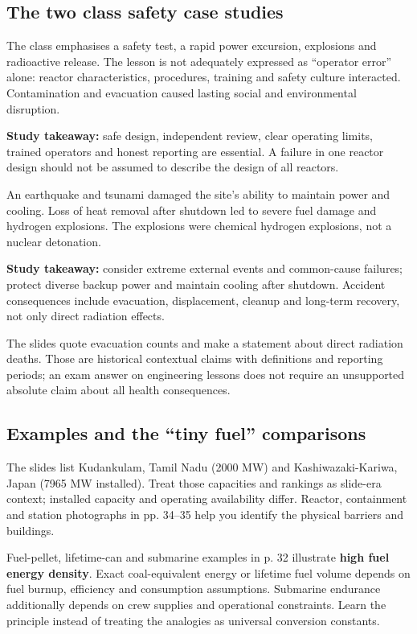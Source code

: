 \documentclass[11pt,a4paper]{article}
\newenvironment{Worked}[1]{\begin{tcolorbox}[breakable=false,colback=white,colframe=teal,colbacktitle=pale,coltitle=ink,title={#1}]}{\end{tcolorbox}}
\begin{document}
\subsection{The two class safety case studies}
\begin{Worked}{Chernobyl, Ukraine / then USSR - 26 April 1986}
The class emphasises a safety test, a rapid power excursion, explosions and radioactive release. The lesson is not adequately expressed as ``operator error'' alone: reactor characteristics, procedures, training and safety culture interacted. Contamination and evacuation caused lasting social and environmental disruption.\par
\textbf{Study takeaway:} safe design, independent review, clear operating limits, trained operators and honest reporting are essential. A failure in one reactor design should not be assumed to describe the design of all reactors.
\end{Worked}
\begin{Worked}{Fukushima Daiichi, Japan - 11 March 2011}
An earthquake and tsunami damaged the site's ability to maintain power and cooling. Loss of heat removal after shutdown led to severe fuel damage and hydrogen explosions. The explosions were chemical hydrogen explosions, not a nuclear detonation.\par
\textbf{Study takeaway:} consider extreme external events and common-cause failures; protect diverse backup power and maintain cooling after shutdown. Accident consequences include evacuation, displacement, cleanup and long-term recovery, not only direct radiation effects.
\end{Worked}
The slides quote evacuation counts and make a statement about direct radiation deaths. Those are historical contextual claims with definitions and reporting periods; an exam answer on engineering lessons does not require an unsupported absolute claim about all health consequences.

\subsection{Examples and the ``tiny fuel'' comparisons}
The slides list Kudankulam, Tamil Nadu (2000 MW) and Kashiwazaki-Kariwa, Japan (7965 MW installed). Treat those capacities and rankings as slide-era context; installed capacity and operating availability differ. Reactor, containment and station photographs in pp. 34--35 help you identify the physical barriers and buildings.

Fuel-pellet, lifetime-can and submarine examples in p. 32 illustrate \textbf{high fuel energy density}. Exact coal-equivalent energy or lifetime fuel volume depends on fuel burnup, efficiency and consumption assumptions. Submarine endurance additionally depends on crew supplies and operational constraints. Learn the principle instead of treating the analogies as universal conversion constants.
\end{document}

